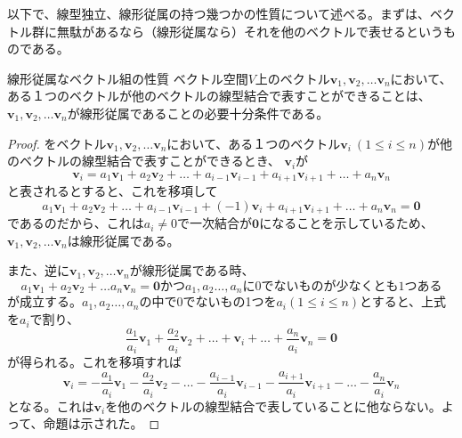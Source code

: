 以下で、線型独立、線形従属の持つ幾つかの性質について述べる。まずは、ベクトル群に無駄があるなら（線形従属なら）それを他のベクトルで表せるというものである。
\begin{theorem*}{線形従属なベクトル組の性質}
	ベクトル空間\(V\)上のベクトル\(\boldsymbol{v}_1,\boldsymbol{v}_2,\dots\boldsymbol{v}_n\)において、ある１つのベクトルが他のベクトルの線型結合で表すことができることは、\(\boldsymbol{v}_1,\boldsymbol{v}_2,\dots\boldsymbol{v}_n\)が線形従属であることの必要十分条件である。
\end{theorem*}
\begin{proof}
	をベクトル\(\boldsymbol{v}_1,\boldsymbol{v}_2,\dots\boldsymbol{v}_n\)において、ある１つのベクトル\(\boldsymbol{v}_i \ (1 \leq i \leq n)\)が他のベクトルの線型結合で表すことができるとき、
	\(\boldsymbol{v}_i\)が
	\begin{equation}
		\boldsymbol{v}_i=a_1\boldsymbol{v}_1+a_2\boldsymbol{v}_2+\dots +  a_{i-1}\boldsymbol{v}_{i-1} +  a_{i+1}\boldsymbol{v}_{i+1}+\dots+a_n\boldsymbol{v}_n
	\end{equation}
	と表されるとすると、これを移項して
	\begin{equation}
		a_1\boldsymbol{v}_1+a_2\boldsymbol{v}_2+\dots +  a_{i-1}\boldsymbol{v}_{i-1}+(-1)\boldsymbol{v}_i+  a_{i+1}\boldsymbol{v}_{i+1}+\dots+a_n\boldsymbol{v}_n=\boldsymbol{0}
	\end{equation}
	であるのだから、これは\(a_i\neq 0\)で一次結合が\(\boldsymbol{0}\)になることを示しているため、\(\boldsymbol{v}_1,\boldsymbol{v}_2,\dots\boldsymbol{v}_n\)は線形従属である。

	また、逆に\(\boldsymbol{v}_1,\boldsymbol{v}_2,\dots\boldsymbol{v}_n\)が線形従属である時、
	\begin{equation}
		a_1\boldsymbol{v}_1+a_2\boldsymbol{v}_2+\dots a_n\boldsymbol{v}_n  =\boldsymbol{0} かつ a_1,a_2\dots,a_nに0でないものが少なくとも1つある
	\end{equation}
	が成立する。\(a_1,a_2\dots,a_n\)の中で\(0\)でないもの1つを\(a_i (1 \leq i \leq n)\)とすると、上式を\(a_i\)で割り、
	\begin{equation}
		\frac{a_1}{a_i}\boldsymbol{v}_1+\frac{a_2}{a_i}\boldsymbol{v}_2+\dots +\boldsymbol{v}_i + \dots   +\frac{a_n}{a_i}\boldsymbol{v}_n=\boldsymbol{0}
	\end{equation}
	が得られる。これを移項すれば
	\begin{equation}
		\boldsymbol{v}_i =-\frac{a_1}{a_i}\boldsymbol{v}_1-\frac{a_2}{a_i}\boldsymbol{v}_2-\dots -\frac{a_{i-1}}{a_i}\boldsymbol{v}_{i-1} -\frac{a_{i+1}}{a_i}\boldsymbol{v}_{i+1}- \dots  -\frac{a_n}{a_i}\boldsymbol{v}_n
	\end{equation}
	となる。これは\(\boldsymbol{v}_i\)を他のベクトルの線型結合で表していることに他ならない。よって、命題は示された。
\end{proof}
